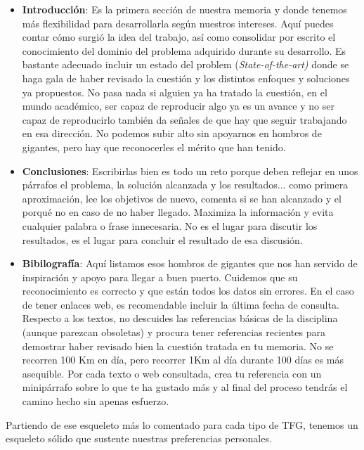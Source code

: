 {\begin{itemize}
    \item \textbf{Introducción}: Es la primera sección de nuestra memoria y donde tenemos más flexibilidad para desarrollarla según nuestros intereses. Aquí puedes contar cómo surgió la idea del trabajo, así como consolidar por escrito el conocimiento del dominio del problema adquirido durante su desarrollo. Es bastante adecuado incluir un estado del problem (\textit{State-of-the-art)} donde se haga gala de haber revisado la cuestión y los distintos enfoques y soluciones ya propuestos. No pasa nada si alguien ya ha tratado la cuestión, en el mundo académico, ser capaz de reproducir algo ya es un avance y no ser capaz de reproducirlo también da señales de que hay que seguir trabajando en esa dirección. No podemos subir alto sin apoyarnos en hombros de gigantes, pero hay que reconocerles el mérito que han tenido.

    \item \textbf{Conclusiones}: Escribirlas bien es todo un reto porque deben reflejar en unos párrafos el problema, la solución alcanzada y los resultados... como primera aproximación, lee los objetivos de nuevo, comenta si se han alcanzado y el porqué no en caso de no haber llegado. Maximiza la información y evita cualquier palabra o frase innecesaria. No es el lugar para discutir los resultados, es el lugar para concluir el resultado de esa discusión. 

    \item \textbf{Bibilografía}: Aquí listamos esos hombros de gigantes que nos han servido de inspiración y apoyo para llegar a buen puerto. Cuidemos que su reconocimiento es correcto y que están todos los datos sin errores. En el caso de tener enlaces web, es recomendable incluir la última fecha de consulta. Respecto a los textos, no descuides las referencias básicas de la disciplina (aunque parezcan obsoletas) y procura tener referencias recientes para demostrar haber revisado bien la cuestión tratada en tu memoria. No se recorren 100 Km en día, pero recorrer 1Km al día durante 100 días es más asequible. Por cada texto o web consultada, crea tu referencia con un minipárrafo sobre lo que te ha gustado más y al final del proceso tendrás el camino hecho sin apenas esfuerzo.
    
\end{itemize}

Partiendo de ese esqueleto más lo comentado para cada tipo de TFG, tenemos un esqueleto sólido que sustente nuestras preferencias personales.

}
